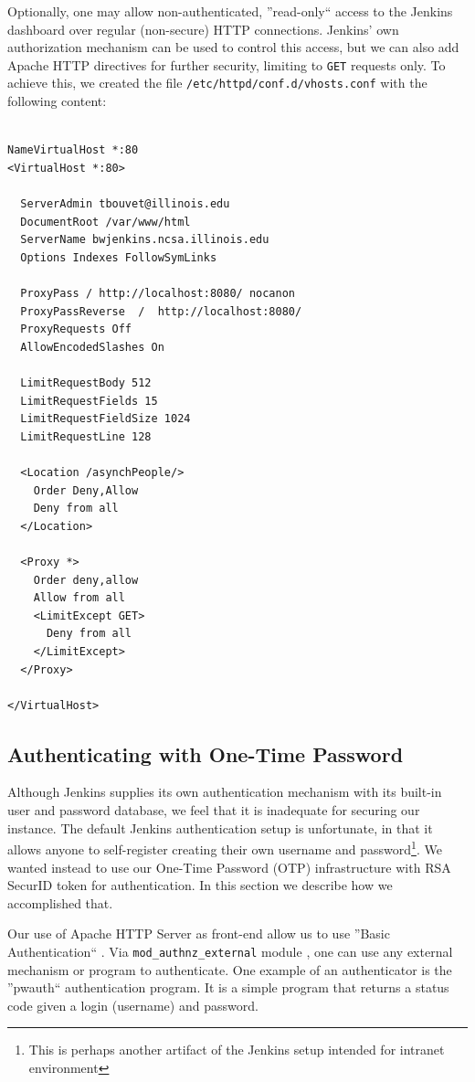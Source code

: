 \documentclass[10pt, conference, compsocconf]{IEEEtran}
\begin{document}
Optionally, one may allow non-authenticated, ''read-only`` access to the Jenkins dashboard over regular (non-secure) HTTP connections. 
Jenkins' own authorization mechanism can be used to control this access, but we can also add Apache HTTP directives for further security, limiting to \texttt{GET} requests only. 
To achieve this, we created the file \texttt{/etc/httpd/conf.d/vhosts.conf} with the following content:
\begin{lstlisting}
 
NameVirtualHost *:80
<VirtualHost *:80>

  ServerAdmin tbouvet@illinois.edu
  DocumentRoot /var/www/html
  ServerName bwjenkins.ncsa.illinois.edu
  Options Indexes FollowSymLinks

  ProxyPass / http://localhost:8080/ nocanon
  ProxyPassReverse  /  http://localhost:8080/
  ProxyRequests Off
  AllowEncodedSlashes On

  LimitRequestBody 512
  LimitRequestFields 15
  LimitRequestFieldSize 1024
  LimitRequestLine 128

  <Location /asynchPeople/>
    Order Deny,Allow
    Deny from all
  </Location>

  <Proxy *>
    Order deny,allow
    Allow from all
    <LimitExcept GET>
      Deny from all
    </LimitExcept>
  </Proxy>

</VirtualHost>

\end{lstlisting}

\subsection{Authenticating with One-Time Password}

Although Jenkins supplies its own authentication mechanism with its built-in user and password database, we feel that it is inadequate for securing our instance. 
The default Jenkins authentication setup is unfortunate, in that it allows anyone to self-register creating their own username and password\footnote{This is perhaps another artifact of the Jenkins setup intended for intranet environment}. 
We wanted instead to use our One-Time Password (OTP) infrastructure with RSA SecurID \cite{RSASecurID} token for authentication. 
In this section we describe how we accomplished that.

Our use of Apache HTTP Server as front-end allow us to use ''Basic Authentication`` \cite{ApacheBasicAuth}. Via \texttt{mod_authnz_external} module \cite{ApacheModAuthExt}, one can use any external mechanism or program to authenticate. 
One example of an authenticator is the ''pwauth`` authentication program. 
It is a simple program that returns a status code given a login (username) and password. 
\end{document}

